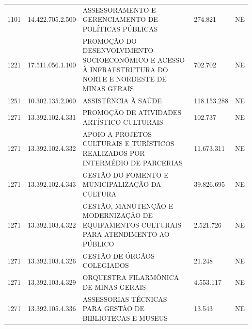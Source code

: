 \documentclass{article}
\begin{document}
\begin{longtable}[c]{m{1cm}|m{2cm}|m{10cm}|m{2cm}|m{1cm}}
\multicolumn{1}{C{1cm}|}{1101} & \multicolumn{1}{C{2cm}|}{14.422.705.2.500} & \multicolumn{1}{L{10cm}|}{ASSESSORAMENTO E GERENCIAMENTO DE POLÍTICAS PÚBLICAS} & \multicolumn{1}{R{2cm}|}{274.821} & \multicolumn{1}{C{1cm}}{NE} \\
\multicolumn{1}{C{1cm}|}{1221} & \multicolumn{1}{C{2cm}|}{17.511.056.1.100} & \multicolumn{1}{L{10cm}|}{PROMOÇÃO DO DESENVOLVIMENTO SOCIOECONÔMICO E ACESSO À INFRAESTRUTURA DO NORTE E NORDESTE DE MINAS GERAIS} & \multicolumn{1}{R{2cm}|}{702.702} & \multicolumn{1}{C{1cm}}{NE} \\
\multicolumn{1}{C{1cm}|}{1251} & \multicolumn{1}{C{2cm}|}{10.302.135.2.060} & \multicolumn{1}{L{10cm}|}{ASSISTÊNCIA À SAÚDE} & \multicolumn{1}{R{2cm}|}{118.153.288} & \multicolumn{1}{C{1cm}}{NE} \\
\multicolumn{1}{C{1cm}|}{1271} & \multicolumn{1}{C{2cm}|}{13.392.102.4.331} & \multicolumn{1}{L{10cm}|}{PROMOÇÃO DE ATIVIDADES ARTÍSTICO-CULTURAIS} & \multicolumn{1}{R{2cm}|}{102.737} & \multicolumn{1}{C{1cm}}{NE} \\
\multicolumn{1}{C{1cm}|}{1271} & \multicolumn{1}{C{2cm}|}{13.392.102.4.332} & \multicolumn{1}{L{10cm}|}{APOIO A PROJETOS CULTURAIS E TURÍSTICOS REALIZADOS POR INTERMÉDIO DE PARCERIAS} & \multicolumn{1}{R{2cm}|}{11.673.311} & \multicolumn{1}{C{1cm}}{NE} \\
\multicolumn{1}{C{1cm}|}{1271} & \multicolumn{1}{C{2cm}|}{13.392.102.4.343} & \multicolumn{1}{L{10cm}|}{GESTÃO DO FOMENTO E MUNICIPALIZAÇÃO DA CULTURA} & \multicolumn{1}{R{2cm}|}{39.826.695} & \multicolumn{1}{C{1cm}}{NE} \\
\multicolumn{1}{C{1cm}|}{1271} & \multicolumn{1}{C{2cm}|}{13.392.103.4.322} & \multicolumn{1}{L{10cm}|}{GESTÃO, MANUTENÇÃO E MODERNIZAÇÃO DE EQUIPAMENTOS CULTURAIS PARA ATENDIMENTO AO PÚBLICO} & \multicolumn{1}{R{2cm}|}{2.521.726} & \multicolumn{1}{C{1cm}}{NE} \\
\multicolumn{1}{C{1cm}|}{1271} & \multicolumn{1}{C{2cm}|}{13.392.103.4.326} & \multicolumn{1}{L{10cm}|}{GESTÃO DE ÓRGÃOS COLEGIADOS} & \multicolumn{1}{R{2cm}|}{21.248} & \multicolumn{1}{C{1cm}}{NE} \\
\multicolumn{1}{C{1cm}|}{1271} & \multicolumn{1}{C{2cm}|}{13.392.103.4.329} & \multicolumn{1}{L{10cm}|}{ORQUESTRA FILARMÔNICA DE MINAS GERAIS} & \multicolumn{1}{R{2cm}|}{4.553.117} & \multicolumn{1}{C{1cm}}{NE} \\
\multicolumn{1}{C{1cm}|}{1271} & \multicolumn{1}{C{2cm}|}{13.392.105.4.336} & \multicolumn{1}{L{10cm}|}{ASSESSORIAS TÉCNICAS PARA GESTÃO DE BIBLIOTECAS E MUSEUS} & \multicolumn{1}{R{2cm}|}{13.543} & \multicolumn{1}{C{1cm}}{NE} \\

\end{longtable}
\end{document}
